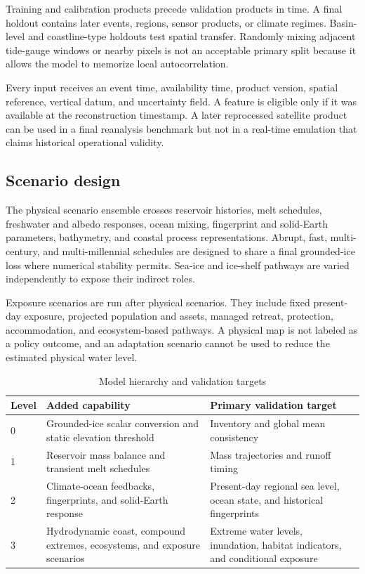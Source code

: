 \documentclass[conference]{IEEEtran}
\begin{document}
Training and calibration products precede validation products in time. A final holdout contains later events, regions, sensor products, or climate regimes. Basin-level and coastline-type holdouts test spatial transfer. Randomly mixing adjacent tide-gauge windows or nearby pixels is not an acceptable primary split because it allows the model to memorize local autocorrelation.

Every input receives an event time, availability time, product version, spatial reference, vertical datum, and uncertainty field. A feature is eligible only if it was available at the reconstruction timestamp. A later reprocessed satellite product can be used in a final reanalysis benchmark but not in a real-time emulation that claims historical operational validity.

\subsection{Scenario design}

The physical scenario ensemble crosses reservoir histories, melt schedules, freshwater and albedo responses, ocean mixing, fingerprint and solid-Earth parameters, bathymetry, and coastal process representations. Abrupt, fast, multi-century, and multi-millennial schedules are designed to share a final grounded-ice loss where numerical stability permits. Sea-ice and ice-shelf pathways are varied independently to expose their indirect roles.

Exposure scenarios are run after physical scenarios. They include fixed present-day exposure, projected population and assets, managed retreat, protection, accommodation, and ecosystem-based pathways. A physical map is not labeled as a policy outcome, and an adaptation scenario cannot be used to reduce the estimated physical water level.

\begin{table}[t]
\caption{Model hierarchy and validation targets}
\label{tab:levels}
\centering
\footnotesize
\setlength{\tabcolsep}{3pt}
\begin{tabular}{p{}p{}p{}}
\toprule
Level & Added capability & Primary validation target\\
\midrule
0 & Grounded-ice scalar conversion and static elevation threshold & Inventory and global mean consistency\\
1 & Reservoir mass balance and transient melt schedules & Mass trajectories and runoff timing\\
2 & Climate-ocean feedbacks, fingerprints, and solid-Earth response & Present-day regional sea level, ocean state, and historical fingerprints\\
3 & Hydrodynamic coast, compound extremes, ecosystems, and exposure scenarios & Extreme water levels, inundation, habitat indicators, and conditional exposure\\
\bottomrule
\end{tabular}
\end{table}
\end{document}
